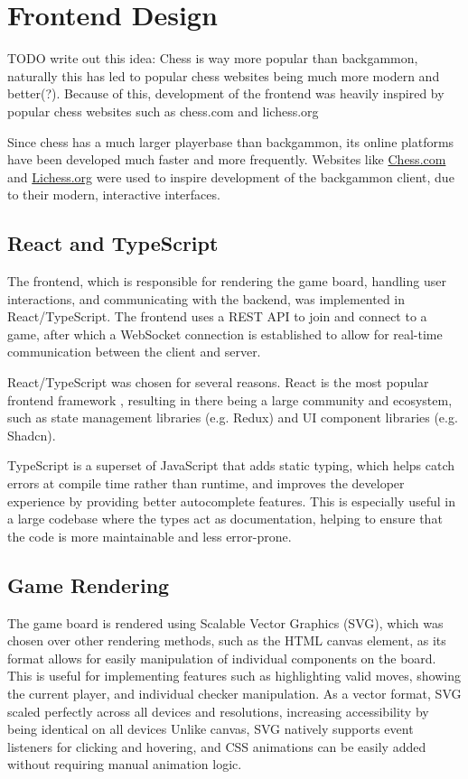 \section{Frontend Design}
TODO write out this idea: Chess is way more popular than backgammon, naturally this has led to popular chess websites being much more modern and better(?). Because of this, development of the frontend was heavily inspired by popular chess websites such as chess.com and lichess.org

Since chess has a much larger playerbase than backgammon, its online platforms have been developed much faster and more frequently. Websites like \href{https://www.chess.com/}{Chess.com} and \href{https://lichess.org/}{Lichess.org} were used to inspire development of the backgammon client, due to their modern, interactive interfaces.

\subsection{React and TypeScript}
The frontend, which is responsible for rendering the game board, handling user interactions, and communicating with the backend, was implemented in React/TypeScript. The frontend uses a REST API to join and connect to a game, after which a WebSocket connection is established to allow for real-time communication between the client and server. 

React/TypeScript was chosen for several reasons. React is the most popular frontend framework \cite{state_of_js_2024}, resulting in there being a large community and ecosystem, such as state management libraries (e.g. Redux) and UI component libraries (e.g. Shadcn).

TypeScript is a superset of JavaScript that adds static typing, which helps catch errors at compile time rather than runtime, and improves the developer experience by providing better autocomplete features. 
This is especially useful in a large codebase where the types act as documentation, helping to ensure that the code is more maintainable and less error-prone.


\subsection{Game Rendering}
The game board is rendered using Scalable Vector Graphics (SVG), which was chosen over other rendering methods, such as the HTML canvas element, as its format allows for easily manipulation of individual components on the board. This is useful for implementing features such as highlighting valid moves, showing the current player, and individual checker manipulation. As a vector format, SVG scaled perfectly across all devices and resolutions, increasing accessibility by being identical on all devices
Unlike canvas, SVG natively supports event listeners for clicking and hovering, and CSS animations can be easily added without requiring manual animation logic.
